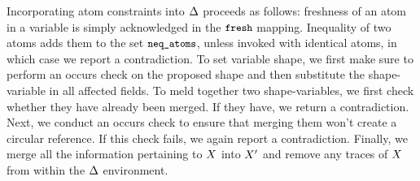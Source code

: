 \documentclass[english, mgr]{iithesis}
\renewcommand{\tt}[1]{\texttt{\small{#1}}}
\newcommand{\NeqAtoms}{\tt{neq\_atoms}}
\newcommand{\Fresh}{\tt{fresh}}
\begin{document}
Incorporating atom constraints into $\Delta$ proceeds as follows:
freshness of an atom in a variable is simply acknowledged in the $\Fresh$ mapping.
Inequality of two atoms adds them to the set $\NeqAtoms$,
unless invoked with identical atoms, in which case we report a contradiction.
To set variable shape, we first make sure to perform an occurs check on the proposed shape
and then substitute the shape-variable in all affected fields.
To meld together two shape-variables, we first check whether they have already been merged.
If they have, we return a contradiction.
Next, we conduct an occurs check to ensure that merging them won't create a circular reference. If this check fails, we again report a contradiction.
Finally, we merge all the information pertaining to $X$ into $X'$ and
remove any traces of $X$ from within the $\Delta$ environment.
\end{document}
